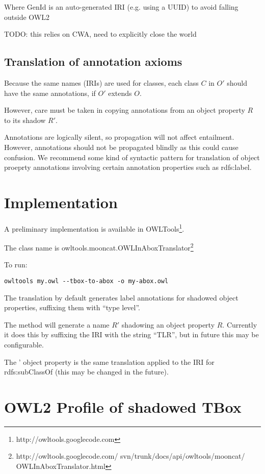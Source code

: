 \documentclass{my}
\def\SubClassOf{\pr{SubClassOf}}
\begin{document}
Where GenId is an auto-generated IRI (e.g. using a UUID) to avoid falling outside OWL2

TODO: this relies on CWA, need to explicitly close the world

\subsection{Translation of annotation axioms}

Because the same names (IRIs) are used for classes, each class $C$ in
$O'$ should have the same annotations, if $O'$ extends $O$.

However, care must be taken in copying annotations from an object
property $R$ to its shadow $R'$.

Annotations are logically silent, so propagation will not affect
entailment. However, annotations should not be propagated blindly as
this could cause confusion. We recommend some kind of syntactic
pattern for translation of object proeprty annotations involving
certain annotation properties such as rdfs:label.

\section{Implementation}

A preliminary implementation is available in
OWLTools\footnote{http://owltools.googlecode.com}.

The class name is
owltools.mooncat.OWLInAboxTranslator\footnote{http://owltools.googlecode.com/ 
svn/trunk/docs/api/owltools/mooncat/ OWLInAboxTranslator.html}

To run:
\begin{verbatim}
owltools my.owl --tbox-to-abox -o my-abox.owl
\end{verbatim}

The translation by default generates label annotations for shadowed
object properties, suffixing them with ``type level''.

The method  will generate a name $R'$ shadowing an
object property $R$. Currently it does this by suffixing the IRI with
the string ``TLR'', but in future this may be configurable.

The \SubClassOf' object property is the same translation applied to
the IRI for rdfs:subClassOf (this may be changed in the future).

\section{OWL2 Profile of shadowed TBox}
\end{document}

